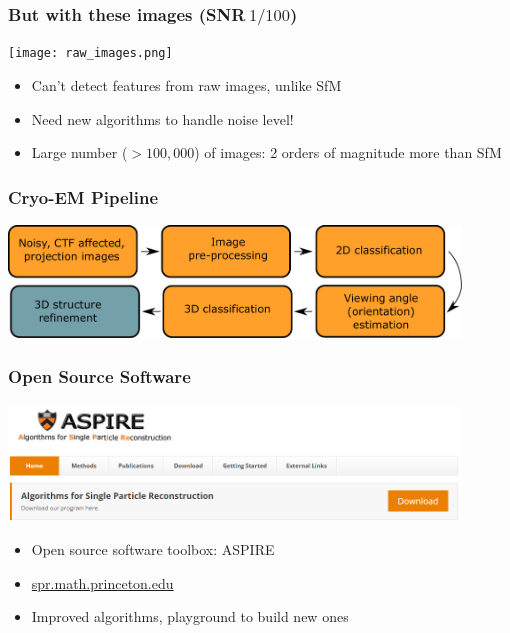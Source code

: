 \documentclass{beamer}
\begin{document}
\begin{frame}
\frametitle{But with these images (SNR$~ 1/100$)}
\begin{center}
\texttt{[image: raw\_images.png]}%
\end{center}
\begin{itemize}
  \item Can't detect features from raw images, unlike SfM
 \item Need new algorithms to handle noise level!
 \item Large number ($>100,000$) of images: 2 orders of magnitude more than SfM
\end{itemize}
\end{frame}
\begin{frame}
\frametitle{Cryo-EM Pipeline}
\begin{center}
\includegraphics[width=0.9\textwidth]{cryoem_pipeline.pdf}%
\end{center}
\end{frame}

\begin{frame}
\frametitle{Open Source Software}
\includegraphics[width=0.9\textwidth]{Aspire.png}%
\begin{itemize}
  \item Open source software toolbox: ASPIRE
   \item \url{spr.math.princeton.edu}
   \item Improved algorithms, playground to build new ones
\end{itemize}
\end{frame}
\end{document}

